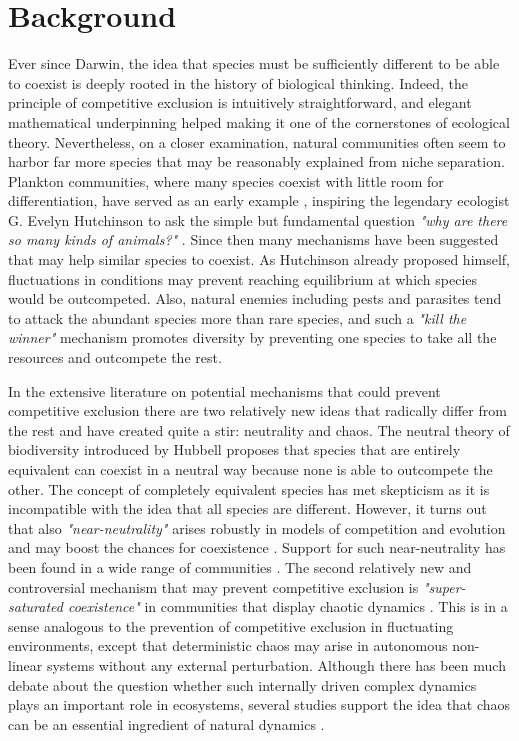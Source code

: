\section{Background}
\label{sec:Background}
Ever since Darwin, the idea that species must be sufficiently different to be able to coexist is deeply rooted in the history of biological thinking. Indeed, the principle of competitive exclusion is intuitively straightforward, and elegant mathematical underpinning\cite{MacArthur} helped making it one of the cornerstones of ecological theory. Nevertheless, on a closer examination, natural communities often seem to harbor far more species that may be reasonably explained from niche separation. Plankton communities, where many species coexist with little room for differentiation, have served as an early example \cite{Hutchinson, Hutchinson1961}, inspiring the legendary ecologist G. Evelyn Hutchinson to ask the simple but fundamental question \textit{"why are there so many kinds of animals?"} \cite{Hutchinson1961}. Since then many mechanisms have been suggested that may help similar species to coexist. As Hutchinson already proposed himself, fluctuations in conditions may prevent reaching equilibrium at which species would be outcompeted. Also, natural enemies including pests and parasites tend to attack the abundant species more than rare species, and such a \textit{"kill the winner"}\cite{Winter2010} mechanism promotes diversity by preventing one species to take all the resources and outcompete the rest.

In the extensive literature on potential mechanisms that could prevent competitive exclusion there are two relatively new ideas that radically differ from the rest and have created quite a stir: neutrality and chaos. The neutral theory of biodiversity introduced by Hubbell \cite{Hubbell2001} proposes that species that are entirely equivalent can coexist in a neutral way because none is able to outcompete the other. The concept of completely equivalent species has met skepticism as it is incompatible with the idea that all species are different. However, it turns out that also \textit{"near-neutrality"} arises robustly in models of competition and evolution and may boost the chances for coexistence \cite{Scheffer2006, Scheffer2018, Fort2009, Fort2010}. Support for such near-neutrality has been found in a wide range of communities \cite{Scheffer2006, Vergnon2013, Scheffera, Segura2013, Vergnon2012}. The second relatively new and controversial mechanism that may prevent competitive exclusion is \textit{"super-saturated coexistence"} in communities that display chaotic dynamics \cite{Huisman1999}. This is in a sense analogous to the prevention of competitive exclusion in fluctuating environments, except that deterministic chaos may arise in autonomous non-linear systems without any external perturbation. Although there has been much debate about the question whether such internally driven complex dynamics plays an important role in ecosystems, several studies support the idea that chaos can be an essential ingredient of natural dynamics \cite{Huisman1999, Beninca2008, Dakos2009b}.

